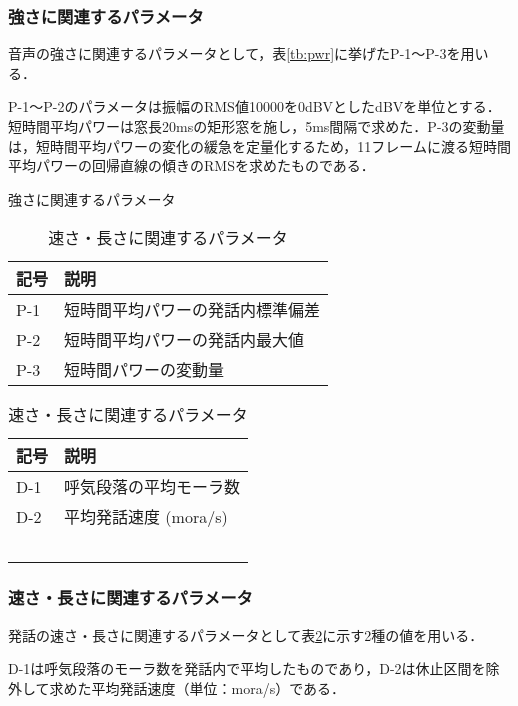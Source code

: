 \documentclass[japanese]{jnlp_1.3c}
\begin{document}
\subsubsection{強さに関連するパラメータ}
音声の強さに関連するパラメータとして，表\ref{tb:pwr}に挙げたP-1〜P-3を用いる．

P-1〜P-2のパラメータは振幅のRMS値10000を0dBVとしたdBVを単位とする．短時間平均パワーは窓長20msの矩形窓を施し，5ms間隔で求めた．P-3の変動量は，短時間平均パワーの変化の緩急を定量化するため，11フレームに渡る短時間平均パワーの回帰直線の傾きのRMSを求めたものである．

\begin{table}[b] 
\begin{minipage}{0.45\textwidth}
\caption{強さに関連するパラメータ}
\label{tb:pwr}
\begin{center}
\begin{tabular}{ll}
\hline
記号&説明 \\ \hline
P-1&短時間平均パワーの発話内標準偏差 \\
P-2&短時間平均パワーの発話内最大値 \\
P-3&短時間パワーの変動量 \\ \hline
\end{tabular}
\end{center}
\end{minipage}
    \hfill
\begin{minipage}{0.45\textwidth}
\begin{center}
\caption{速さ・長さに関連するパラメータ}
\label{tb:dur}
\begin{tabular}{ll}
\hline
記号&説明 \\ \hline
D-1&呼気段落の平均モーラ数 \\
D-2&平均発話速度 (mora/s) \\ \hline
　　\\
\end{tabular}
\end{center}
\end{minipage}
\end{table}

\subsubsection{速さ・長さに関連するパラメータ}
発話の速さ・長さに関連するパラメータとして表\ref{tb:dur}に示す2種の値を用いる．

D-1は呼気段落のモーラ数を発話内で平均したものであり，D-2は休止区間を除外して求めた平均発話速度（単位：mora/s）である．
\end{document}
